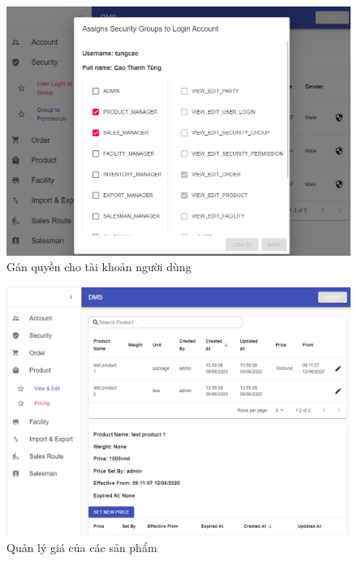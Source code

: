 \begin{figure}[H]
\centering
\includegraphics[width=15cm]{images/demo/user-login-to-group.png}
\caption{Gán quyền cho tài khoản người dùng}
\end{figure}

\begin{figure}[H]
\centering
\includegraphics[width=15cm]{images/demo/product-price.png}
\caption{Quản lý giá của các sản phẩm}
\end{figure}

